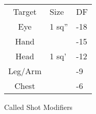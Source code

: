 \begin{SHTable}
	\begin{tabular}{cll}
	Target	& Size & DF\\
	Eye		& 1 sq''& -18 \\
	Hand	&  		& -15 \\
	Head	& 1 sq' & -12 \\
	Leg/Arm & 		& -9 \\
	Chest	& 		& -6  \\
    \end{tabular}
    \caption{Called Shot Modifiers}
\end{SHTable}


